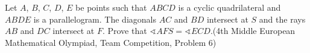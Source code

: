 Let $A$,  $B$,  $C$,  $D$,  $E$ be points such that $ABCD$ is a cyclic quadrilateral and $ABDE$ is a parallelogram. The diagonals $AC$ and $BD$ intersect at $S$ and the rays $AB$ and $DC$ intersect at $F$. Prove that $\sphericalangle{AFS}=\sphericalangle{ECD}$.(4th Middle European Mathematical Olympiad, Team Competition, Problem 6)